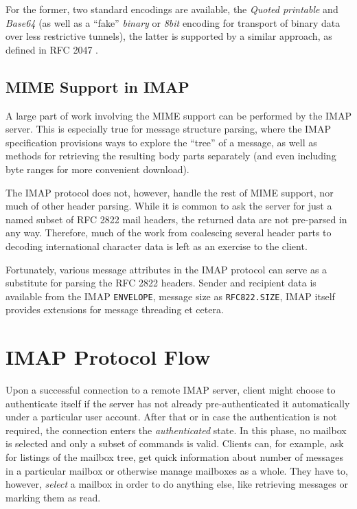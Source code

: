 \documentclass[12pt,notitlepage]{report}
\begin{document}
For the former, two standard encodings are available, the {\em Quoted printable}
and {\em Base64} (as well as a ``fake'' {\em binary} or {\em 8bit} encoding for
transport of binary data over less restrictive tunnels), the latter is supported
by a similar approach, as defined in RFC 2047 \cite{rfc-2047}.

\subsection{MIME Support in IMAP}

A large part of work involving the MIME support can be performed by the IMAP
server.  This is especially true for message structure parsing, where the IMAP
specification provisions ways to explore the ``tree'' of a message, as well as
methods for retrieving the resulting body parts separately (and even including
byte ranges for more convenient download).

The IMAP protocol does not, however, handle the rest of MIME support, nor much of
other header parsing.  While it is common to ask the server for just a named
subset of RFC 2822 mail headers, the returned data are not pre-parsed in any
way.  Therefore, much of the work from coalescing several header parts to
decoding international character data is left as an exercise to the client.

Fortunately, various message attributes in the IMAP protocol can serve as a
substitute for parsing the RFC 2822 headers.  Sender and recipient data is
available from the IMAP {\tt ENVELOPE}, message size as {\tt RFC822.SIZE}, IMAP
itself provides extensions for message threading \cite{rfc-threading} et cetera.

\section{IMAP Protocol Flow}

Upon a successful connection to a remote IMAP server, client might choose to
authenticate itself if the server has not already pre-authenticated it automatically
under a particular user account.  After that or in case the authentication is
not required, the connection enters the {\em authenticated} state.  In this
phase, no mailbox is selected and only a subset of commands is valid.  Clients
can, for example, ask for listings of the mailbox tree, get quick information
about number of messages in a particular mailbox or otherwise manage mailboxes
as a whole.  They have to, however, {\em select} a mailbox in order to do
anything else, like retrieving messages or marking them as read.
\end{document}
